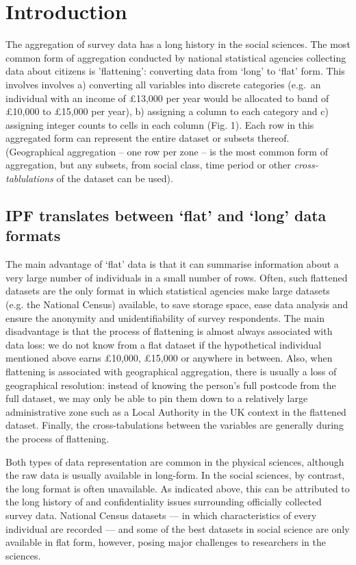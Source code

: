 \documentclass[a4paper,10pt]{article}
\begin{document}
\section{Introduction}
The aggregation of survey data has a long history in the social sciences. 
The most common form of 
aggregation conducted by national statistical agencies collecting data about citizens 
is 'flattening': converting data from `long' to `flat' form. This involves involves a) converting all 
variables into discrete categories (e.g.~an individual with an income of £13,000 per year
would be allocated to band of £10,000 to £15,000 per year), b) assigning a column to each category and c) assigning 
integer counts to cells in each column (Fig. 1). Each row in this aggregated form can 
represent the entire dataset or subsets thereof. (Geographical aggregation – one row 
per zone – is the most common form of aggregation, but any subsets, from social class, 
time period or other \emph{cross-tablulations} of the dataset can be used).

\subsection{IPF translates between `flat' and `long' data formats}
The main advantage of `flat' data is that it can summarise information about a very large number of individuals
in a small number of rows. Often, such flattened datasets are the only format in which 
statistical agencies make large datasets (e.g. the National Census) available, 
to save storage space, ease data analysis and ensure the anonymity and unidentifiability of survey respondents.
The main disadvantage is that the process of flattening is almost always associated with data loss: we do 
not know from a flat dataset if the hypothetical individual mentioned above earns \pounds10,000, \pounds15,000 or 
anywhere in between. Also, when flattening is associated with geographical aggregation, there is usually
a loss of geographical resolution: instead of knowing the person's full postcode from the full dataset, we 
may only be able to pin them down to a relatively large administrative zone such as a Local Authority in the UK context
in the flattened dataset. Finally, the cross-tabulations between the variables are generally during the process of 
flattening.

Both types of data representation are common in the physical sciences, although the raw data 
is usually available in long-form. In the social sciences, by contrast, the long format is often unavailable. 
As indicated above, this can be attributed to the long history of and confidentiality 
issues surrounding officially collected survey data. National Census datasets --- in which characteristics of 
every individual are recorded --- and some of the best datasets in social science are only available 
in flat form, however, posing major challenges to researchers in the sciences. 
\end{document}
